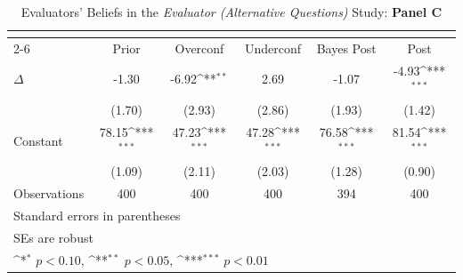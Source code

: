 \begin{table}[htbp]\centering
\def\sym#1{\ifmmode^{#1}\else\(^{#1}\)\fi}
\caption{Evaluators' Beliefs in the \textit{Evaluator (Alternative Questions)} Study: \textbf{Panel C}}
\begin{tabular}{l*{5}{c}}
\hline\hline
                &\multicolumn{5}{c}{}                                                                          \\\cmidrule(lr){2-6}
                &\multicolumn{1}{c}{Prior}&\multicolumn{1}{c}{Overconf}&\multicolumn{1}{c}{Underconf}&\multicolumn{1}{c}{Bayes Post}&\multicolumn{1}{c}{Post}\\
\hline
$\Delta$        &    -1.30         &    -6.92\sym{**} &     2.69         &    -1.07         &    -4.93\sym{***}\\
                &   (1.70)         &   (2.93)         &   (2.86)         &   (1.93)         &   (1.42)         \\
Constant        &    78.15\sym{***}&    47.23\sym{***}&    47.28\sym{***}&    76.58\sym{***}&    81.54\sym{***}\\
                &   (1.09)         &   (2.11)         &   (2.03)         &   (1.28)         &   (0.90)         \\
\hline
Observations    &      400         &      400         &      400         &      394         &      400         \\
\hline\hline
\multicolumn{6}{l}{\footnotesize Standard errors in parentheses}\\
\multicolumn{6}{l}{\footnotesize SEs are robust}\\
\multicolumn{6}{l}{\footnotesize \sym{*} \(p<0.10\), \sym{**} \(p<0.05\), \sym{***} \(p<0.01\)}\\
\end{tabular}
\end{table}
